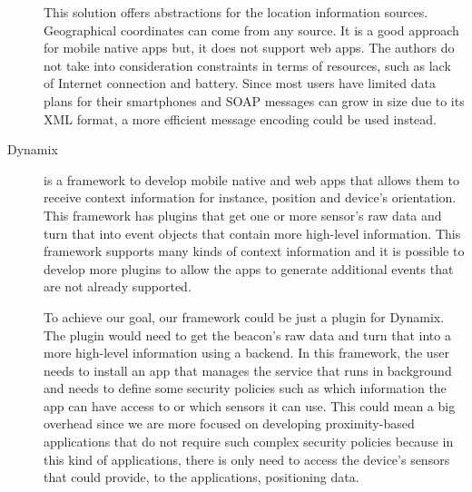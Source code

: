 \begin{description}
  This solution offers abstractions for the location
  information sources. Geographical coordinates can
  come from any source. It is a good approach for
  mobile native apps but, it does not support web apps.
  The authors do not take into consideration
  constraints in terms of resources, such as
  lack of Internet connection and battery.
  Since most users have limited data plans for
  their smartphones and \gls{SOAP} messages can
  grow in size due to its \gls{XML} format,
  a more efficient message encoding could be used
  instead.
  \item[Dynamix\cite{Carlson2012}]
  is a framework to develop
  mobile native and web apps that allows them to receive
  context information for instance, position and device's
  orientation. This framework has plugins that get
  one or more sensor's raw data and turn that into event
  objects that contain more high-level information.
  This framework supports many kinds of context information
  and it is possible to develop more plugins to allow the
  apps to generate additional events that are not
  already supported.

  To achieve our goal, our framework could be just a
  plugin for Dynamix. The plugin would
  need to get the beacon's raw data and
  turn that into a more high-level information
  using a backend. In this framework,
  the user needs to install an app that manages the service
  that runs in background and needs to define some
  security policies such as which information the app can have access to or which sensors it can use. This could mean a big overhead since
  we are more focused on developing proximity-based applications that do not require such complex security
  policies because in this kind of applications, there is only need
  to access the device's sensors that could provide,
  to the applications, positioning data.
\end{description}

